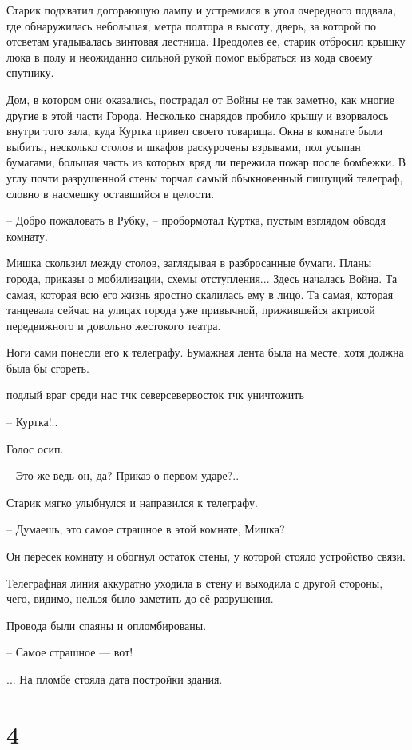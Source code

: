 \documentclass[a5paper]{article}
\begin{document}
Старик подхватил догорающую лампу и устремился в угол очередного подвала, где обнаружилась небольшая, метра полтора в высоту, дверь, за которой по отсветам угадывалась винтовая лестница. Преодолев ее, старик отбросил крышку люка в полу и неожиданно сильной рукой помог выбраться из хода своему спутнику.

Дом, в котором они оказались, пострадал от Войны не так заметно, как многие другие в этой части Города. Несколько снарядов пробило крышу и взорвалось внутри того зала, куда Куртка привел своего товарища. Окна в комнате были выбиты, несколько столов и шкафов раскурочены взрывами, пол усыпан бумагами, большая часть из которых вряд ли пережила пожар после бомбежки. В углу почти разрушенной стены торчал самый обыкновенный пишущий телеграф, словно в насмешку оставшийся в целости.

-- Добро пожаловать в Рубку, -- пробормотал Куртка, пустым взглядом обводя комнату.

Мишка скользил между столов, заглядывая в разбросанные бумаги. Планы города, приказы о мобилизации, схемы отступления... Здесь началась Война. Та самая, которая всю его жизнь яростно скалилась ему в лицо. Та самая, которая танцевала сейчас на улицах города уже привычной, прижившейся актрисой передвижного и довольно жестокого театра.

Ноги сами понесли его к телеграфу. Бумажная лента была на месте, хотя должна была бы сгореть.

подлый враг среди нас тчк северсевервосток тчк уничтожить

-- Куртка!..

Голос осип.

-- Это же ведь он, да? Приказ о первом ударе?..

Старик мягко улыбнулся и направился к телеграфу.

-- Думаешь, это самое страшное в этой комнате, Мишка?

Он пересек комнату и обогнул остаток стены, у которой стояло устройство связи.

Телеграфная линия аккуратно уходила в стену и выходила с другой стороны, чего, видимо, нельзя было заметить до её разрушения.

Провода были спаяны и опломбированы.

-- Самое страшное --- вот!

... На пломбе стояла дата постройки здания.

\section*{4}
\end{document}
